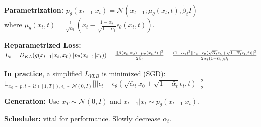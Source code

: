 \textbf{Parametrization:} $p_\theta(x_{t-1} | x_t) = \mathcal{N}(x_{t-1}; \mu_{\theta}(x_t, t), \tilde{\beta}_t I)$\\ 
where $\mu_\theta(x_t, t) = \frac{1}{\sqrt{\alpha_t}} (x_t - \frac{1-\alpha_t}{\sqrt{1-\bar \alpha_t}} \epsilon_\theta(x_t, t))$.

\textbf{Reparametrized Loss:}
$L_t = D_{KL}(q(x_{t-1} | x_t, x_0)||p_\theta(x_{t-1}|x_t))\\ = \frac{||\tilde \mu(x_t, x_0) - \mu_\theta(x_t, t)||^2}{2 \tilde \beta_t} %
= \frac{(1-\alpha_t)^2 ||\epsilon_t - \epsilon_\theta(\sqrt{\bar\alpha_t}x_0 + \sqrt{1-\bar\alpha_t}\epsilon_t, t)||^2}{2 \alpha_t (1-\bar \alpha_t) \tilde\beta_t}$

\textbf{In practice}, a simplified $L_{VLB}$ is minimized (SGD): $\mathbb{E}_{x_0 \sim p, t \sim \mathcal{U}([1,T]), \epsilon_t \sim \mathcal{N}(0, I)}[||\epsilon_t - \epsilon_\theta(\sqrt{\bar\alpha_t}x_0 + \sqrt{1-\bar\alpha_t}\epsilon_t, t)||_2^2$

\textbf{Generation:} Use $x_T \sim \mathcal{N}(0, I)$ and $x_{t-1} | x_t \sim p_\theta(x_{t-1} | x_t)$.

\textbf{Scheduler:} vital for performance. Slowly decrease $\bar \alpha_t$.

